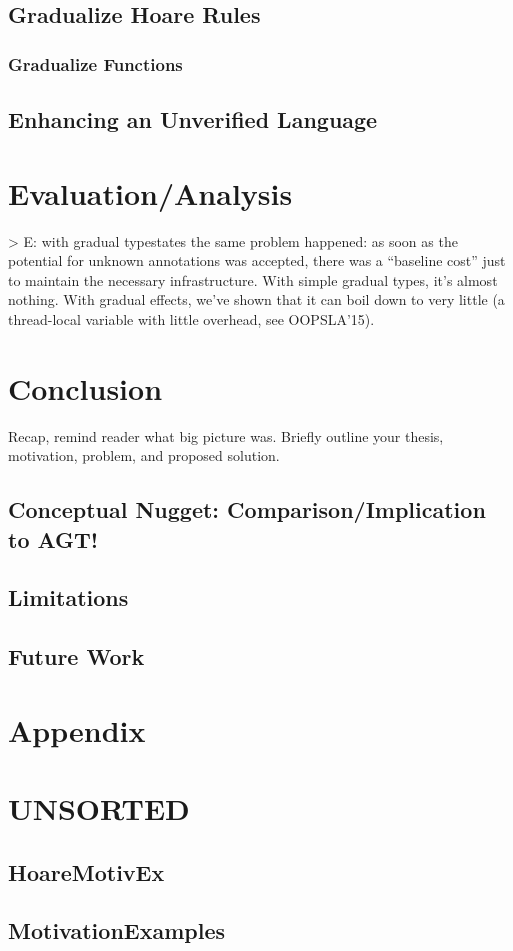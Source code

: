 \section{Gradualize Hoare Rules}

\subsection{Gradualize Functions}

\section{Enhancing an Unverified Language}


\chapter{Evaluation/Analysis}
> E:
with gradual typestates the same problem happened: as soon as the potential for unknown annotations was accepted, there was a “baseline cost” just to maintain the necessary infrastructure.
With simple gradual types, it’s almost nothing. With gradual effects, we’ve shown that it can boil down to very little (a thread-local variable with little overhead, see OOPSLA’15). 



\chapter{Conclusion}
Recap, remind reader what big picture was.
Briefly outline your thesis, motivation, problem, and proposed solution.

\section{Conceptual Nugget: Comparison/Implication to AGT!}

\section{Limitations}

\section{Future Work}


\chapter{Appendix}


\chapter{UNSORTED}

\section{HoareMotivEx}
\label{sec:hoaremotivex}


\section{MotivationExamples}
\label{sec:motivationexamples}

